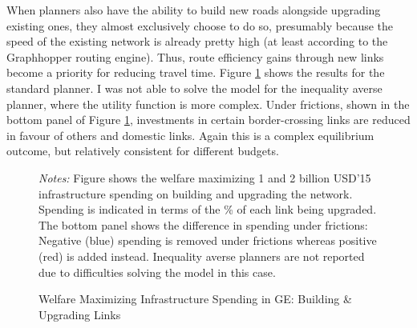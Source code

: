 \documentclass[a4paper]{article}
\begin{document}
When planners also have the ability to build new roads alongside upgrading existing ones, they almost exclusively choose to do so, presumably because the speed of the existing network is already pretty high (at least according to the Graphhopper routing engine). Thus, route efficiency gains through new links become a priority for reducing travel time. Figure \ref{fig:GE_BUGNOfr} shows the results for the standard planner. I was not able to solve the model for the inequality averse planner, where the utility function is more complex. Under frictions, shown in the bottom panel of Figure \ref{fig:GE_BUGNOfr}, investments in certain border-crossing links are reduced in favour of others and domestic links. Again this is a complex equilibrium outcome, but relatively consistent for different budgets.  \newline

\begin{figure}[h!] \vspace{-2mm}
\centering
\caption{\label{fig:GE_BUGNOfr} Welfare Maximizing Infrastructure Spending in GE: Building \& Upgrading Links}
\vspace{2mm}
\raggedright
\scriptsize 
\emph{Notes:} Figure shows the welfare maximizing 1 and 2 billion USD'15 infrastructure spending on building and upgrading the network. Spending is indicated in terms of the \% of each link being upgraded. The bottom panel shows the difference in spending under frictions: Negative (blue) spending is removed under frictions whereas positive (red) is added instead. Inequality averse planners are not reported due to difficulties solving the model in this case. 
\end{figure}
\end{document}
